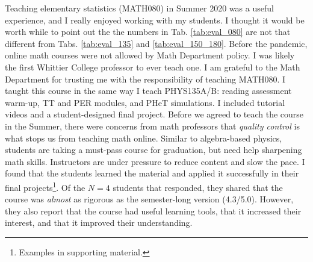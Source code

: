 \documentclass[../../main.tex]{subfiles}
\begin{document}
Teaching elementary statistics (MATH080) in Summer 2020 was a useful experience, and I really enjoyed working with my students.  I thought it would be worth while to point out the the numbers in Tab. \ref{tab:eval_080} are not that different from Tabs. \ref{tab:eval_135} and \ref{tab:eval_150_180}.  Before the pandemic, online math courses were not allowed by Math Department policy.  I was likely the first Whittier College professor to ever teach one.  I am grateful to the Math Department for trusting me with the responsibility of teaching MATH080.  I taught this course in the same way I teach PHYS135A/B: reading assessment warm-up, TT and PER modules, and PHeT simulations.  I included tutorial videos and a student-designed final project.  Before we agreed to teach the course in the Summer, there were concerns from math professors that \textit{quality control} is what stops us from teaching math online.  Similar to algebra-based physics, students are taking a must-pass course for graduation, but need help sharpening math skills.  Instructors are under pressure to reduce content and slow the pace.  I found that the students learned the material and applied it successfully in their final projects\footnote{Examples in supporting material.}.  Of the $N = 4$ students that responded, they shared that the course was \textit{almost} as rigorous as the semester-long version (4.3/5.0).  However, they also report that the course had useful learning tools, that it increased their interest, and that it improved their understanding.
\end{document}
